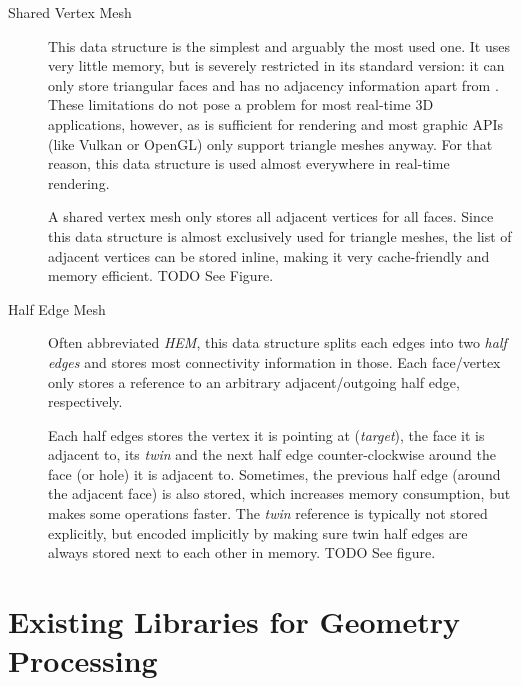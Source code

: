 \begin{description}
  \item [Shared Vertex Mesh] This data structure is the simplest and arguably the most used one.
  It uses very little memory, but is severely restricted in its standard version:
  it can only store triangular faces and has no adjacency information apart from .
  These limitations do not pose a problem for most real-time 3D applications, however, as  is sufficient for rendering and most graphic APIs (like Vulkan or OpenGL) only support triangle meshes anyway.
  For that reason, this data structure is used almost everywhere in real-time rendering.

  A shared vertex mesh only stores all adjacent vertices for all faces.
  Since this data structure is almost exclusively used for triangle meshes, the list of adjacent vertices can be stored inline, making it very cache-friendly and memory efficient. TODO See Figure.

  \item [Half Edge Mesh] Often abbreviated \emph{HEM}, this data structure splits each edges into two \emph{half edges} and stores most connectivity information in those.
  Each face/vertex only stores a reference to an arbitrary adjacent/outgoing half edge, respectively.

  Each half edges stores the vertex it is pointing at (\emph{target}), the face it is adjacent to, its \emph{twin} and the next half edge counter-clockwise around the face (or hole) it is adjacent to.
  Sometimes, the previous half edge (around the adjacent face) is also stored, which increases memory consumption, but makes some operations faster.
  The \emph{twin} reference is typically not stored explicitly, but encoded implicitly by making sure twin half edges are always stored next to each other in memory. TODO See figure.
\end{description}


\section{Existing Libraries for Geometry Processing}
